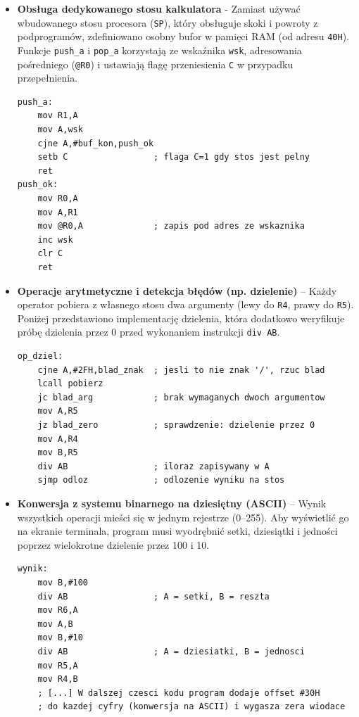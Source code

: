 \documentclass[11pt, a4paper]{article}
\begin{document}
\begin{itemize}
    \item \textbf{Obsługa dedykowanego stosu kalkulatora} - Zamiast używać wbudowanego stosu procesora (\texttt{SP}), który obsługuje skoki i powroty z podprogramów, zdefiniowano osobny bufor w pamięci RAM (od adresu \texttt{40H}). Funkcje \texttt{push\_a} i \texttt{pop\_a} korzystają ze wskaźnika \texttt{wsk}, adresowania pośredniego (\texttt{@R0}) i ustawiają flagę przeniesienia \texttt{C} w przypadku przepełnienia.
\begin{lstlisting}
push_a:
    mov R1,A
    mov A,wsk
    cjne A,#buf_kon,push_ok
    setb C                 ; flaga C=1 gdy stos jest pelny
    ret
push_ok:
    mov R0,A
    mov A,R1
    mov @R0,A              ; zapis pod adres ze wskaznika
    inc wsk
    clr C
    ret
\end{lstlisting}

    \item \textbf{Operacje arytmetyczne i detekcja błędów (np. dzielenie)} -- Każdy operator pobiera z własnego stosu dwa argumenty (lewy do \texttt{R4}, prawy do \texttt{R5}). Poniżej przedstawiono implementację dzielenia, która dodatkowo weryfikuje próbę dzielenia przez 0 przed wykonaniem instrukcji \texttt{div AB}.
\begin{lstlisting}
op_dziel:
    cjne A,#2FH,blad_znak  ; jesli to nie znak '/', rzuc blad
    lcall pobierz
    jc blad_arg            ; brak wymaganych dwoch argumentow
    mov A,R5
    jz blad_zero           ; sprawdzenie: dzielenie przez 0
    mov A,R4
    mov B,R5
    div AB                 ; iloraz zapisywany w A
    sjmp odloz             ; odlozenie wyniku na stos
\end{lstlisting}
    
    \item \textbf{Konwersja z systemu binarnego na dziesiętny (ASCII)} -- Wynik wszystkich operacji mieści się w jednym rejestrze (0--255). Aby wyświetlić go na ekranie terminala, program musi wyodrębnić setki, dziesiątki i jedności poprzez wielokrotne dzielenie przez 100 i 10.
\begin{lstlisting}
wynik:
    mov B,#100
    div AB                 ; A = setki, B = reszta
    mov R6,A               
    mov A,B
    mov B,#10
    div AB                 ; A = dziesiatki, B = jednosci
    mov R5,A
    mov R4,B
    ; [...] W dalszej czesci kodu program dodaje offset #30H 
    ; do kazdej cyfry (konwersja na ASCII) i wygasza zera wiodace
\end{lstlisting}


\end{itemize}
\end{document}
